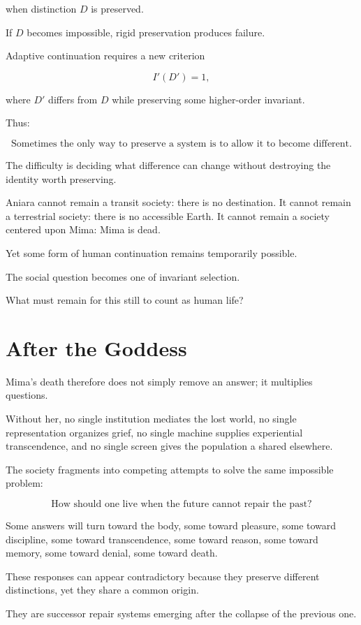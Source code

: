 \documentclass[11pt,oneside]{book}
\theoremstyle{definition}
\theoremstyle{remark}
\begin{document}
when distinction \(D\) is preserved.

If \(D\) becomes impossible, rigid preservation produces failure.

Adaptive continuation requires a new criterion

\[
I'(D')=1,
\]

where \(D'\) differs from \(D\) while preserving some higher-order invariant.

Thus:

\[
\boxed{
\text{Sometimes the only way to preserve a system is to allow it to become different.}
}
\]

The difficulty is deciding what difference can change without destroying the identity worth preserving.

Aniara cannot remain a transit society: there is no destination. It cannot remain a terrestrial society: there is no accessible Earth. It cannot remain a society centered upon Mima: Mima is dead.

Yet some form of human continuation remains temporarily possible.

The social question becomes one of invariant selection.

What must remain for this still to count as human life?

\section{After the Goddess}

Mima's death therefore does not simply remove an answer; it multiplies questions.

Without her, no single institution mediates the lost world, no single representation organizes grief, no single machine supplies experiential transcendence, and no single screen gives the population a shared elsewhere.

The society fragments into competing attempts to solve the same impossible problem:

\[
\text{How should one live when the future cannot repair the past?}
\]

Some answers will turn toward the body, some toward pleasure, some toward discipline, some toward transcendence, some toward reason, some toward memory, some toward denial, some toward death.

These responses can appear contradictory because they preserve different distinctions, yet they share a common origin.

They are successor repair systems emerging after the collapse of the previous one.
\end{document}

